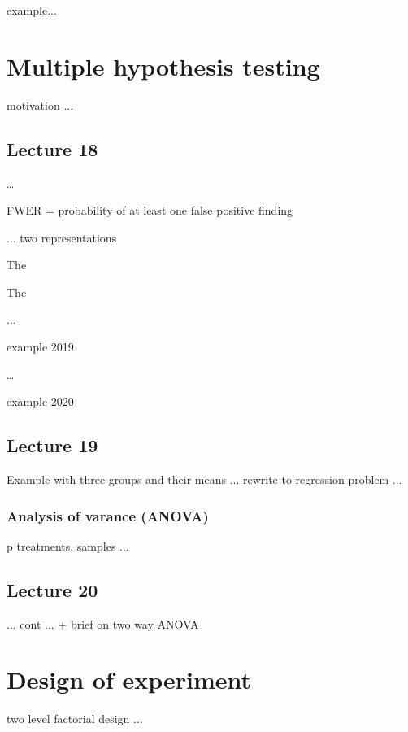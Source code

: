 example...

\newpage\section{Multiple hypothesis testing}


motivation ...

\subsection*{Lecture 18}

\dots


FWER = probability of at least one false positive finding


... two representations 


The 

  

The 


...

example 2019 



\dots

example 2020


\subsection*{Lecture 19}

Example with three groups and their means ... rewrite to regression problem ...

 

\subsubsection*{Analysis of varance (ANOVA)}
p treatments, samples ...

 


\subsection*{Lecture  20}


... cont ... + brief on two way ANOVA


\newpage\section{Design of experiment}


two level factorial design ... 

